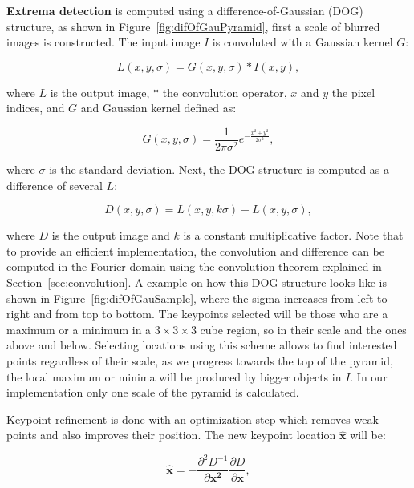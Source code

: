 \documentclass[12pt]{article}
\begin{document}
\textbf{Extrema detection} is computed using a difference-of-Gaussian (DOG) structure, as shown in Figure~\ref{fig:difOfGauPyramid}, first a scale of blurred images is constructed.
The input image $I$ is convoluted with a Gaussian kernel $G$:

\begin{equation}
L(x,y,\sigma) = G(x,y,\sigma) * I(x,y),
\end{equation}

where $L$ is the output image, $*$ the convolution operator, $x$ and $y$ the pixel indices, and $G$ and Gaussian kernel defined as:

\begin{equation}
G(x,y,\sigma) = \frac{1}{2 \pi \sigma^2} e^{- \frac{x^2 + y^2}{2 \sigma^2}},
\end{equation}

where $\sigma$ is the standard deviation.
Next, the DOG structure is computed as a difference of several $L$:

\begin{equation}
D(x,y,\sigma) = L(x,y, k\sigma) - L(x,y, \sigma),
\end{equation}

where $D$ is the output image and $k$ is a constant multiplicative factor.
Note that to provide an efficient implementation, the convolution and difference can be computed in the Fourier domain using the convolution theorem explained in Section~\ref{sec:convolution}.
A example on how this DOG structure looks like is shown in Figure~\ref{fig:difOfGauSample}, where the sigma increases from left to right and from top to bottom.
The keypoints selected will be those who are a maximum or a minimum in a $3 \times 3 \times 3$ cube region, so in their scale and the ones above and below.
Selecting locations using this scheme allows to find interested points regardless of their scale, as we progress towards the top of the pyramid,  the local maximum or minima will be produced by bigger objects in $I$.
In our implementation only one scale of the pyramid is calculated.

Keypoint refinement is done with an optimization step which removes weak points and also improves their position.
The new keypoint location $\mathbf{\hat{x}}$ will be:

\begin{equation}
\mathbf{\hat{x}} = - \frac{\partial^2 D^{-1}}{\partial \mathbf{x^2}} \frac{\partial D}{\partial \mathbf{x}},
\end{equation}
\end{document}
